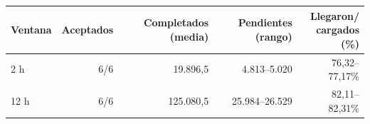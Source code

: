 \begin{tabular}{lrrrr}\hline
Ventana & Aceptados & Completados (media) & Pendientes (rango) & \shortstack{Llegaron/\\cargados (\%)} \\\hline
2 h & 6/6 & 19.896,5 & 4.813--5.020 & 76,32--77,17\% \\
12 h & 6/6 & 125.080,5 & 25.984--26.529 & 82,11--82,31\% \\
\hline\end{tabular}

